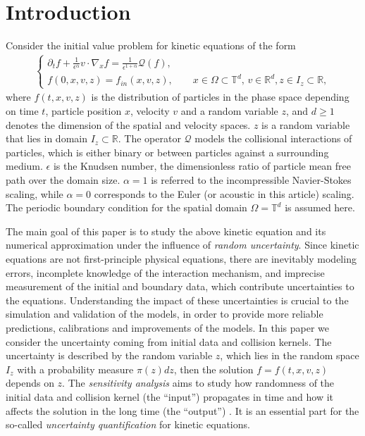 \documentclass[final,onefignum,onetabnum]{siamart171218}
\begin{document}
\section{Introduction}
 Consider the initial value problem for kinetic equations of the form
 \begin{align}
\label{model}
\left\{
\begin{array}{l}
  \displaystyle \partial_t f + \frac{1}{\epsilon^\alpha} v\cdot\nabla_x f=
  \frac{1}{\epsilon^{1+\alpha}} \mathcal Q(f),  \\[4pt]
\displaystyle  f(0,x,v,z)=f_{in}(x,v,z), \qquad x\in\Omega\subset\mathbb T^d,  \, v\in \mathbb R^d, z\in I_z \subset \mathbb R,
\end{array}\right.
\end{align}
where $f(t,x,v,z)$ is the distribution of particles in the phase space depending
on time $t$, particle position $x$, velocity $v$ and a random variable
$z$, and $d\geq 1$ denotes the dimension of the spatial and velocity spaces.
$z$ is a random variable that lies in domain $I_z\subset \mathbb R $.
The operator $\mathcal Q$ models the collisional interactions of particles, which is either binary or between particles against a
surrounding medium. $\epsilon$ is the Knudsen number, the dimensionless
ratio of particle mean free path over the domain size. $\alpha=1$ is referred
to the incompressible Navier-Stokes scaling, while $\alpha=0$ corresponds
to the Euler (or acoustic in this article) scaling.
The periodic boundary condition for the spatial domain $\Omega=\mathbb T^d$ is assumed here.

The main goal of this paper is to study the above kinetic equation
and its numerical approximation
under the influence of {\it random uncertainty}.
Since kinetic equations are not  first-principle physical equations,
there are inevitably modeling errors,
incomplete knowledge of the interaction mechanism, and imprecise measurement of the initial and boundary data,
which contribute uncertainties to the equations. Understanding the impact of these uncertainties
is crucial to the simulation and validation of the models, in order to
provide more reliable predictions, calibrations and improvements of the models.
In this paper we consider the uncertainty coming from initial data and collision kernels.
The uncertainty is described by the random variable $z$, which lies in the random space
$I_z$ with a probability measure $\pi(z)dz$, then the solution $f=f(t,x,v,z)$ depends on $z$.
The {\it sensitivity analysis} aims  to study how randomness of the initial data and collision kernel (the ``input'') propagates in time and how it affects the solution in the long time (the ``output'') \cite{SmithBook}.
It is an essential part for the so-called {\it uncertainty quantification} for
kinetic equations.
\end{document}
